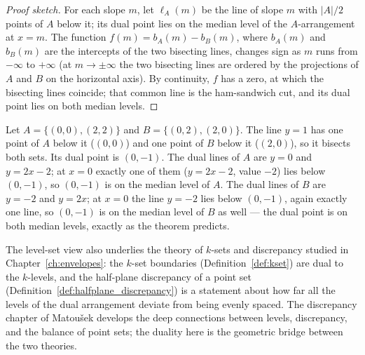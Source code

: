 \begin{proof}[Proof sketch]
  For each slope $m$, let $\ell_A(m)$ be the line of slope $m$ with
  $|A|/2$ points of $A$ below it; its dual point lies on the median level of
  the $A$-arrangement at $x = m$. The function $f(m) = b_A(m) - b_B(m)$,
  where $b_A(m)$ and $b_B(m)$ are the intercepts of the two bisecting lines,
  changes sign as $m$ runs from $-\infty$ to $+\infty$ (at $m \to \pm
  \infty$ the two bisecting lines are ordered by the projections of $A$ and
  $B$ on the horizontal axis). By continuity, $f$ has a zero, at which the
  bisecting lines coincide; that common line is the ham-sandwich cut, and
  its dual point lies on both median levels.
\end{proof}

\begin{example}\label{ex:geo_duality_ham_sandwich}
  Let $A = \{(0,0), (2,2)\}$ and $B = \{(0,2), (2,0)\}$. The line $y = 1$
  has one point of $A$ below it ($(0,0)$) and one point of $B$ below it
  ($(2,0)$), so it bisects both sets. Its dual point is $(0,-1)$. The dual
  lines of $A$ are $y = 0$ and $y = 2x - 2$; at $x = 0$ exactly one of them
  ($y = 2x - 2$, value $-2$) lies below $(0,-1)$, so $(0,-1)$ is on the
  median level of $A$. The dual lines of $B$ are $y = -2$ and $y = 2x$;
  at $x = 0$ the line $y = -2$ lies below $(0,-1)$, again exactly one line,
  so $(0,-1)$ is on the median level of $B$ as well --- the dual point is on
  both median levels, exactly as the theorem predicts.
\end{example}

The level-set view also underlies the theory of $k$-sets and discrepancy
studied in Chapter~\ref{ch:envelopes}: the $k$-set boundaries
(Definition~\ref{def:kset}) are dual to the $k$-levels, and the half-plane
discrepancy of a point set (Definition~\ref{def:halfplane_discrepancy}) is
a statement about how far all the levels of the dual arrangement deviate
from being evenly spaced. The discrepancy chapter of Matou\v{s}ek
\cite{matousek1999} develops the deep connections between levels,
discrepancy, and the balance of point sets; the duality here is the
geometric bridge between the two theories.

